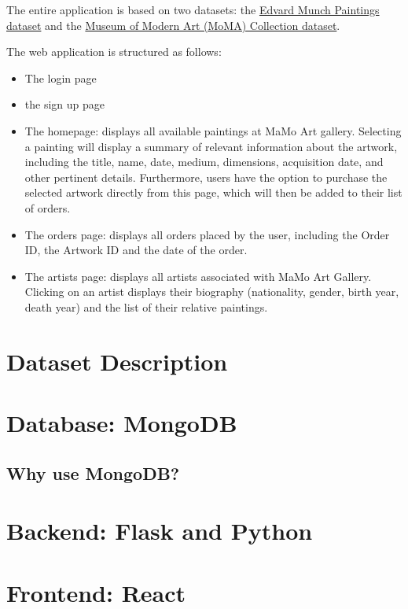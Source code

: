 \documentclass[a4paper,12pt]{article}
\begin{document}
The entire application is based on two datasets: the \href{https://www.kaggle.com/datasets/isaienkov/edvard-munch-paintings}{Edvard Munch Paintings dataset} and the \href{https://www.kaggle.com/datasets/momanyc/museum-collection?select=artworks.csv}{Museum of Modern Art (MoMA) Collection dataset}.

The web application is structured as follows:

\begin{itemize}
    \item The login page
    \item the sign up page

    \item The homepage: displays all available paintings at MaMo Art gallery. Selecting a painting will display a summary of relevant information about the artwork, including the title, name, date, medium, dimensions, acquisition date, and other pertinent details. Furthermore, users have the option to purchase the selected artwork directly from this page, which will then be added to their list of orders.

    \item The orders page: displays all orders placed by the user, including the Order ID, the Artwork ID and the date of the order.

    \item The artists page:  displays all artists associated with MaMo Art Gallery. Clicking on an artist displays their biography (nationality, gender, birth year, death year) and the list of their relative paintings.

\end{itemize}

\section{Dataset Description}
\justify

\section{Database: MongoDB}
\justify

\subsection{Why use MongoDB?}
\justify

\section{Backend: Flask and Python}
\justify

\section{Frontend: React}
\justify
\end{document}
